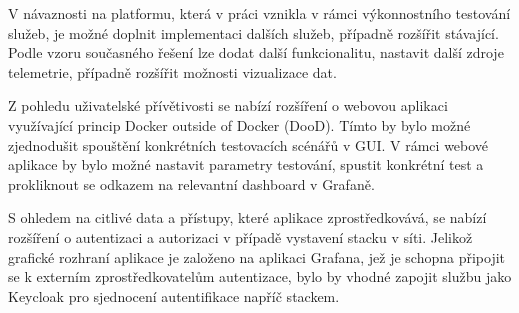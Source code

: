 
V návaznosti na platformu, která v práci vznikla v rámci výkonnostního testování služeb, je možné doplnit implementaci dalších služeb, případně rozšířit stávající. Podle vzoru současného řešení lze dodat další funkcionalitu, nastavit další zdroje telemetrie, případně rozšířit možnosti vizualizace dat.

Z pohledu uživatelské přívětivosti se nabízí rozšíření o webovou aplikaci využívající princip Docker outside of Docker (DooD). Tímto by bylo možné zjednodušit spouštění konkrétních testovacích scénářů v GUI. V rámci webové aplikace by bylo možné nastavit parametry testování, spustit konkrétní test a prokliknout se odkazem na relevantní dashboard v Grafaně. 

S ohledem na citlivé data a přístupy, které aplikace zprostředkovává, se nabízí rozšíření o autentizaci a autorizaci v případě vystavení stacku v síti. Jelikož grafické rozhraní aplikace je založeno na aplikaci Grafana, jež je schopna připojit se k externím zprostředkovatelům autentizace, bylo by vhodné zapojit službu jako Keycloak pro sjednocení autentifikace napříč stackem.